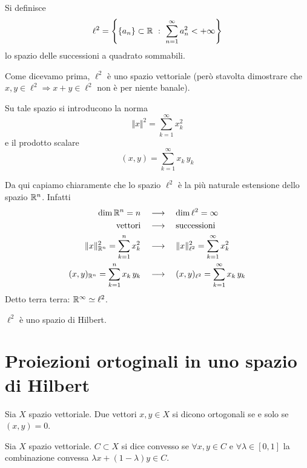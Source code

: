 \begin{defn}
Si definisce
\begin{equation*}
\ell^{2} = \left\{\{a_{n}\} \subset \mathbb{R}\ :\ \sum\limits^{\infty}_{n = 1} a_{n}^{2} < + \infty \right\}
\end{equation*}
lo spazio delle successioni a quadrato sommabili.
\end{defn}
Come dicevamo prima, $\ell^2$ è uno spazio vettoriale (però stavolta dimostrare che $x,y\in\ell^2\Rightarrow x+y\in\ell^2$ non è per niente banale).

Su tale spazio si introducono la norma
\begin{equation*}
\Vert x\Vert^2=\sum_{k=1}^\infty x_k^2
\end{equation*}
e il  prodotto scalare
\begin{equation*}
(x,y)=\sum_{k=1}^\infty x_k\,y_k
\end{equation*}

Da qui capiamo chiaramente che lo spazio $\ell^2$ è la più naturale estensione dello spazio $\mathbb{R}^n$. Infatti
\begin{align*}
\dim\mathbb{R}^n=n \quad &\longrightarrow \quad \dim\ell^2=\infty \\
\text{vettori} \quad &\longrightarrow \quad \text{successioni} \\
\Vert x\Vert^2_{\mathbb{R}^n}=\sum_{k=1}^n x_k^2 \quad &\longrightarrow \quad \Vert x\Vert^2_{\ell^2}=\sum_{k=1}^\infty x_k^2 \\
(x,y)_{\mathbb{R}^n}=\sum_{k=1}^n x_k\, y_k \quad &\longrightarrow \quad (x,y)_{\ell^2}=\sum_{k=1}^\infty x_k\, y_k
\end{align*}
Detto terra terra: $\mathbb{R}^\infty\simeq\ell^2$.

\begin{thm}
$\ell^2$ è uno spazio di Hilbert.
\end{thm}

\newpage


\section{Proiezioni ortoginali in uno spazio di Hilbert}

\begin{defn}
Sia $X$ spazio vettoriale. Due vettori $x,y\in X$ si dicono ortogonali se e solo se $(x,y)=0$.
\end{defn}

\begin{defn}
Sia $X$ spazio vettoriale. $C\subset X$ si dice convesso se $\forall x, y\in C$ e $\forall \lambda \in [0, 1]$ la combinazione convessa $\lambda x + (1 - \lambda) y\in C$.
\end{defn}

